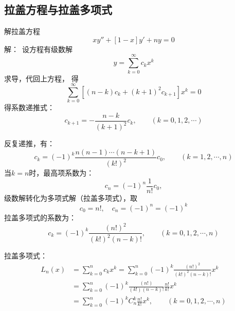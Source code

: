 \subsection{拉盖方程与拉盖多项式}


	{解拉盖方程}
	\begin{equation*}
		\boxed{x y''  + [1 -x] y' +n y =0}
	\end{equation*}	
	{\alert{解：}}~设方程有级数解
	\begin{equation*}
		y=\sum_{k=0}^{\infty} c_k x^k
	\end{equation*}	
	求导，代回上方程， 得 
	\begin{equation*}
		\sum_{k=0}^{\infty} [(n-k)c_k +(k+1)^2 c_{k+1}  ] x^k =0
	\end{equation*}	
	得系数递推式：
	\begin{equation*}
		c_{k+1}=-\frac{n-k}{(k+1)^2} c_k, \qquad (k=0,1,2,\cdots)
	\end{equation*}	
	


	反复递推，有：
	\begin{equation*}
		c_{k}=(-1)^k \frac{n(n-1)\cdots (n-k+1)}{(k!)^2} c_0, \qquad (k=1,2,\cdots, n)
	\end{equation*}	
	当$k=n$时，最高项系数为：
	\begin{equation*}
		c_{n}=(-1)^n \frac{1}{n!} c_0, 
	\end{equation*}	
	级数解转化为多项式解（拉盖多项式），取
	\begin{equation*}
		c_{0}=n!, \quad  c_{n}=(-1)^n = (-1)^k 
	\end{equation*}	
	拉盖多项式的系数为：
	\begin{equation*}
		c_{k}=(-1)^k \frac{(n!) ^2}{(k!)^2 (n-k)!},  \qquad (k=0,1,2,\cdots, n)
	\end{equation*}	
	


	拉盖多项式：
	\begin{equation*}
	\begin{split}
		L_n(x) &=\sum_{k=0}^{n} c_{k} x^k= \sum_{k=0}^{n} (-1)^k \frac{(n!)^2 }{(k!)^2 (n-k)!}x^k \\
		&= \sum_{k=0}^{n} (-1)^k \frac{(n!) }{(k!) (n-k)!} \frac{n!}{k!}x^k   \\
		&= \sum_{k=0}^{n} (-1)^k C^k _n \frac{n!}{k!}x^k,    \qquad (k=0,1,2,\cdots, n)
	\end{split}		
	\end{equation*}	
	


